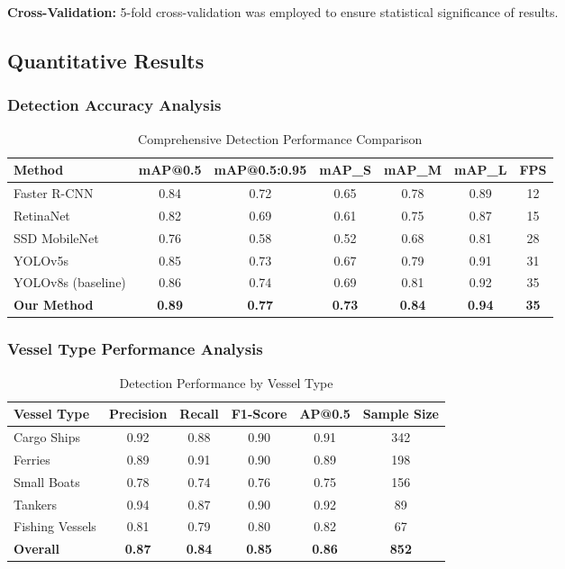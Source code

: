 \documentclass[a4paper,11pt]{article}
\begin{document}
\textbf{Cross-Validation:} 5-fold cross-validation was employed to ensure statistical significance of results.

\subsection{Quantitative Results}

\subsubsection{Detection Accuracy Analysis}

\begin{table}[H]
\centering
\caption{Comprehensive Detection Performance Comparison}
\label{tab:detection_performance}
\begin{tabular}{@{}lcccccc@{}}
\toprule
Method & mAP@0.5 & mAP@0.5:0.95 & mAP\_S & mAP\_M & mAP\_L & FPS \\
\midrule
Faster R-CNN & 0.84 & 0.72 & 0.65 & 0.78 & 0.89 & 12 \\
RetinaNet & 0.82 & 0.69 & 0.61 & 0.75 & 0.87 & 15 \\
SSD MobileNet & 0.76 & 0.58 & 0.52 & 0.68 & 0.81 & 28 \\
YOLOv5s & 0.85 & 0.73 & 0.67 & 0.79 & 0.91 & 31 \\
YOLOv8s (baseline) & 0.86 & 0.74 & 0.69 & 0.81 & 0.92 & 35 \\
\textbf{Our Method} & \textbf{0.89} & \textbf{0.77} & \textbf{0.73} & \textbf{0.84} & \textbf{0.94} & \textbf{35} \\
\bottomrule
\end{tabular}
\end{table}

\subsubsection{Vessel Type Performance Analysis}

\begin{table}[H]
\centering
\caption{Detection Performance by Vessel Type}
\label{tab:vessel_performance}
\begin{tabular}{@{}lccccc@{}}
\toprule
Vessel Type & Precision & Recall & F1-Score & AP@0.5 & Sample Size \\
\midrule
Cargo Ships & 0.92 & 0.88 & 0.90 & 0.91 & 342 \\
Ferries & 0.89 & 0.91 & 0.90 & 0.89 & 198 \\
Small Boats & 0.78 & 0.74 & 0.76 & 0.75 & 156 \\
Tankers & 0.94 & 0.87 & 0.90 & 0.92 & 89 \\
Fishing Vessels & 0.81 & 0.79 & 0.80 & 0.82 & 67 \\
\midrule
\textbf{Overall} & \textbf{0.87} & \textbf{0.84} & \textbf{0.85} & \textbf{0.86} & \textbf{852} \\
\bottomrule
\end{tabular}
\end{table}
\end{document}
